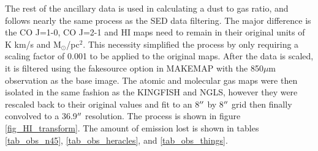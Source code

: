 The rest of the ancillary data is used in calculating a dust to gas ratio, and follows nearly the same process as the SED data filtering.  The major difference is the CO J=1-0, CO J=2-1 and HI maps need to remain in their original units of K km/s and M$_\odot$/pc$^2$.  This necessity simplified the process by only requiring a scaling factor of 0.001 to be applied to the original maps.  After the data is scaled, it is filtered using the fakesource option in MAKEMAP with the 850$\mu$m observation as the base image.  The atomic and molecular gas maps were then isolated in the same fashion as the KINGFISH and NGLS, however they were rescaled back to their original values and fit to an 8$\mbox{$^{\prime\prime}$}$ by 8$\mbox{$^{\prime\prime}$}$ grid then finally convolved to a 36.9$\mbox{$^{\prime\prime}$}$ resolution.  The process is shown in figure \ref{fig_HI_transform}.  The amount of emission lost is shown in tables \ref{tab_obs_n45}, \ref{tab_obs_heracles}, and \ref{tab_obs_things}.

